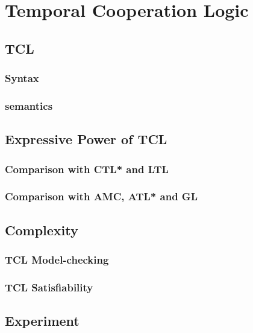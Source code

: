 \chapter{Temporal Cooperation Logic}
\label{c:tcl}

\section{TCL}
\subsection{Syntax}
\subsection{semantics}

\section{Expressive Power of TCL}
\subsection{Comparison with CTL* and LTL}
\subsection{Comparison with AMC, ATL* and GL}

\section{Complexity}
\subsection{TCL Model-checking}
\subsection{TCL Satisfiability}

\section{Experiment}
